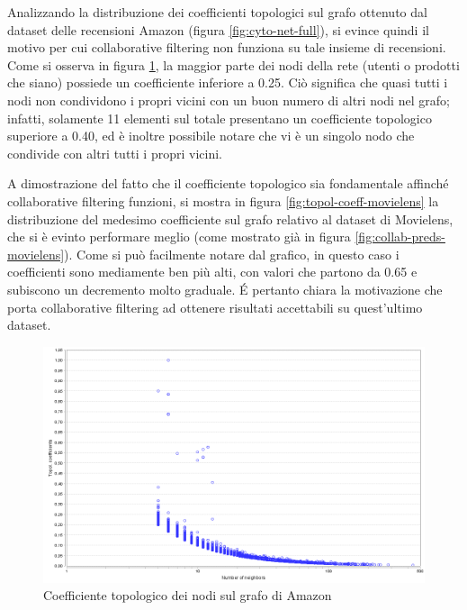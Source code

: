 \documentclass[hidelinks, 12pt]{article}
\begin{document}
Analizzando la distribuzione dei coefficienti topologici sul grafo ottenuto dal dataset delle recensioni Amazon (figura \ref{fig:cyto-net-full}), si evince quindi il motivo per cui collaborative filtering non funziona su tale insieme di recensioni. Come si osserva in figura \ref{fig:topol-coeff-amazon}, la maggior parte dei nodi della rete (utenti o prodotti che siano) possiede un coefficiente inferiore a 0.25. Ciò significa che quasi tutti i nodi non condividono i propri vicini con un buon numero di altri nodi nel grafo; infatti, solamente 11 elementi sul totale presentano un coefficiente topologico superiore a 0.40, ed è inoltre possibile notare che vi è un singolo nodo che condivide con altri tutti i propri vicini.

A dimostrazione del fatto che il coefficiente topologico sia fondamentale affinché collaborative filtering funzioni, si mostra in figura \ref{fig:topol-coeff-movielens} la distribuzione del medesimo coefficiente sul grafo relativo al dataset di Movielens, che si è evinto performare meglio (come mostrato già in figura \ref{fig:collab-preds-movielens}). Come si può facilmente notare dal grafico, in questo caso i coefficienti sono mediamente ben più alti, con valori che partono da 0.65 e subiscono un decremento molto graduale. É pertanto chiara la motivazione che porta collaborative filtering ad ottenere risultati accettabili su quest'ultimo dataset.

\begin{figure}[H]
	\centering
	\includegraphics[scale=0.25]{images/07_07_topological.png}
	\caption[Coefficiente topologico dei nodi sul grafo di Amazon]{Coefficiente topologico dei nodi sul grafo di Amazon}
	\label{fig:topol-coeff-amazon}
\end{figure}
\end{document}
